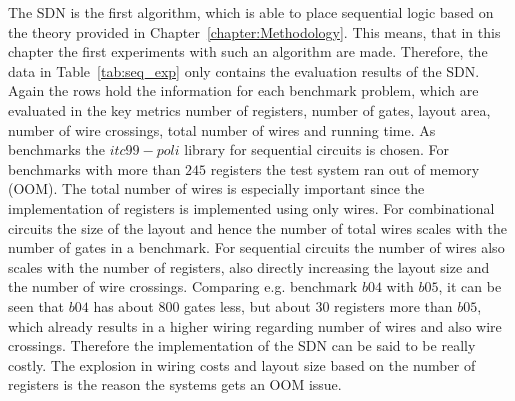 The SDN is the first algorithm, which is able to place sequential logic based on the theory provided in Chapter~\ref{chapter:Methodology}. This means, that in this chapter the first experiments with such an algorithm are made. Therefore, the data in Table~\ref{tab:seq_exp} only contains the evaluation results of the SDN. Again the rows hold the information for each benchmark problem, which are evaluated in the key metrics number of registers, number of gates, layout area, number of wire crossings, total number of wires and running time. As benchmarks the $itc99-poli$ library for sequential circuits is chosen. For benchmarks with more than $245$ registers the test system ran out of memory (OOM).
The total number of wires is especially important since the implementation of registers is implemented using only wires. For combinational circuits the size of the layout and hence the number of total wires scales with the number of gates in a benchmark. For sequential circuits the number of wires also scales with the number of registers, also directly increasing the layout size and the number of wire crossings. Comparing e.g. benchmark $b04$ with $b05$, it can be seen that $b04$ has about $800$ gates less, but about $30$ registers more than $b05$, which already results in a higher wiring regarding number of wires and also wire crossings. Therefore the implementation of the SDN can be said to be really costly. The explosion in wiring costs and layout size based on the number of registers is the reason the systems gets an OOM issue.
%

